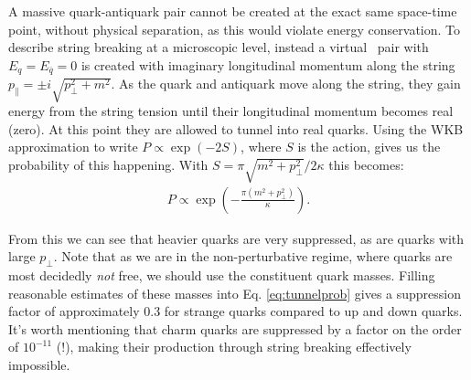   A massive quark-antiquark pair cannot be created at the exact same space-time point, without physical separation, %
  as this would violate energy conservation. 
  To describe string breaking at a microscopic level, instead a virtual \qqbar\ pair with $E_q = E_{\overline{q}} = 0$ is created with imaginary longitudinal momentum along the string $p_\parallel = \pm i\sqrt{p_\perp^2 + m^2}$. As the quark and antiquark move along the string, they gain energy from the string tension until their longitudinal momentum becomes real (zero). At this point they are allowed to tunnel into real quarks. Using the WKB approximation to write $P \propto \exp(-2S)$, where $S$ is the action, gives us  the probability of this happening. \cite{StringModelSlides} With $S = \pi\sqrt{m^2 + p_\perp^2}/2\kappa$ this becomes:
  \begin{align}    
    P \propto \exp\left(-\frac{\pi(m^2 + p_\perp^2)}{\kappa}\right). \label{eq:tunnelprob}
  \end{align}
  
  From this we can see that heavier quarks are very suppressed, as are quarks with large $p_\perp$. Note that as we are in the non-perturbative regime, where quarks are most decidedly \textit{not} free, we should use the constituent quark masses. Filling  
  reasonable estimates of these masses into Eq. \ref{eq:tunnelprob} gives a suppression factor of approximately 0.3 for strange quarks compared to up and down quarks. It's worth mentioning that charm quarks are suppressed by a factor on the order of $10^{-11}$ (!), making their production through string breaking effectively impossible. 

